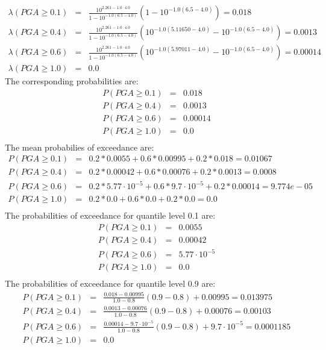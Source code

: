 \begin{eqnarray}
\lambda(PGA \geq 0.1) &=& \frac{10^{2.261 - 1.0\cdot4.0}}{1 - 10^{-1.0(6.5 - 4.0)}}(1 - 10^{-1.0(6.5 - 4.0)}) = 0.018\nonumber \\
\lambda(PGA \geq 0.4) &=& \frac{10^{2.261 - 1.0\cdot4.0}}{1 - 10^{-1.0(6.5 - 4.0)}}(10^{-1.0(5.11650-4.0)} - 10^{-1.0(6.5 - 4.0)}) = 0.0013\nonumber \\
\lambda(PGA \geq 0.6) &=& \frac{10^{2.261 - 1.0\cdot4.0}}{1 - 10^{-1.0(6.5 - 4.0)}}(10^{-1.0(5.97011-4.0)} - 10^{-1.0(6.5 - 4.0)}) =  0.00014\nonumber \\
\lambda(PGA \geq 1.0) &=& 0.0
\end{eqnarray}
The corresponding probabilities are:
\begin{eqnarray}
P(PGA \geq 0.1) &=& 0.018\nonumber \\
P(PGA \geq 0.4) &=& 0.0013\nonumber \\
P(PGA \geq 0.6) &=& 0.00014\nonumber \\
P(PGA \geq 1.0) &=& 0.0\nonumber \\
\end{eqnarray}
The mean probabilies of exceedance are:
\begin{eqnarray}
P(PGA \geq 0.1) &=& 0.2 * 0.0055 + 0.6 * 0.00995 + 0.2 * 0.018 = 0.01067\nonumber \\
P(PGA \geq 0.4) &=& 0.2 * 0.00042 + 0.6 * 0.00076 + 0.2 * 0.0013 = 0.0008\nonumber \\
P(PGA \geq 0.6) &=& 0.2 * 5.77\cdot 10^{-5} + 0.6 * 9.7 \cdot 10^{-5} + 0.2 * 0.00014 = 9.774e-05\nonumber \\
P(PGA \geq 1.0) &=& 0.2 * 0.0 + 0.6 * 0.0 + 0.2 * 0.0 = 0.0\nonumber \\
\end{eqnarray}
The probabilities of exceedance for quantile level 0.1 are:
\begin{eqnarray}
P(PGA \geq 0.1) &=& 0.0055\nonumber \\
P(PGA \geq 0.4) &=& 0.00042\nonumber \\
P(PGA \geq 0.6) &=& 5.77\cdot 10^{-5}\nonumber \\
P(PGA \geq 1.0) &=& 0.0\nonumber \\
\end{eqnarray}
The probabilities of exceedance for quantile level 0.9 are:
\begin{eqnarray}
P(PGA \geq 0.1) &=& \frac{0.018 -  0.00995}{1.0 - 0.8}(0.9 - 0.8) + 0.00995 = 0.013975\nonumber \\
P(PGA \geq 0.4) &=& \frac{0.0013 -  0.00076}{1.0 - 0.8}(0.9 - 0.8) + 0.00076 = 0.00103\nonumber \\
P(PGA \geq 0.6) &=& \frac{0.00014 -  9.7\cdot 10^{-5}}{1.0 - 0.8}(0.9 - 0.8) + 9.7\cdot 10^{-5} = 0.0001185\nonumber \\
P(PGA \geq 1.0) &=& 0.0
\end{eqnarray}
%
\clearpage
%
